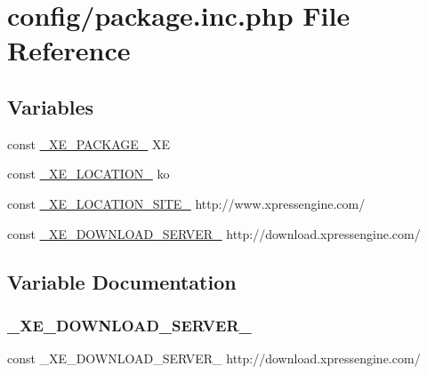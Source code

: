 \hypertarget{package_8inc_8php}{}\section{config/package.inc.\+php File Reference}
\label{package_8inc_8php}
\subsection*{Variables}
\begin{DoxyCompactItemize}
\item 
const \hyperlink{package_8inc_8php_ac4384cdc784342cd44d75952334decb4}{\+\_\+\+X\+E\+\_\+\+P\+A\+C\+K\+A\+G\+E\+\_\+} \textquotesingle{}XE\textquotesingle{}
\item 
const \hyperlink{package_8inc_8php_a7330debbfb3a027cdd5f3d3dd1dfbdd0}{\+\_\+\+X\+E\+\_\+\+L\+O\+C\+A\+T\+I\+O\+N\+\_\+} \textquotesingle{}ko\textquotesingle{}
\item 
const \hyperlink{package_8inc_8php_a063bfd2eb9f811b1676d0dbc0cad2648}{\+\_\+\+X\+E\+\_\+\+L\+O\+C\+A\+T\+I\+O\+N\+\_\+\+S\+I\+T\+E\+\_\+} \textquotesingle{}http\+://www.\+xpressengine.\+com/\textquotesingle{}
\item 
const \hyperlink{package_8inc_8php_a22df32d3e0eae0d60d6cddb9ec99d5ec}{\+\_\+\+X\+E\+\_\+\+D\+O\+W\+N\+L\+O\+A\+D\+\_\+\+S\+E\+R\+V\+E\+R\+\_\+} \textquotesingle{}http\+://download.\+xpressengine.\+com/\textquotesingle{}
\end{DoxyCompactItemize}


\subsection{Variable Documentation}
\mbox{\label{package_8inc_8php_a22df32d3e0eae0d60d6cddb9ec99d5ec}} 
\subsubsection{\texorpdfstring{\+\_\+\+X\+E\+\_\+\+D\+O\+W\+N\+L\+O\+A\+D\+\_\+\+S\+E\+R\+V\+E\+R\+\_\+}{\_XE\_DOWNLOAD\_SERVER\_}}
{\footnotesize\ttfamily const \+\_\+\+X\+E\+\_\+\+D\+O\+W\+N\+L\+O\+A\+D\+\_\+\+S\+E\+R\+V\+E\+R\+\_\+ \textquotesingle{}http\+://download.\+xpressengine.\+com/\textquotesingle{}}



